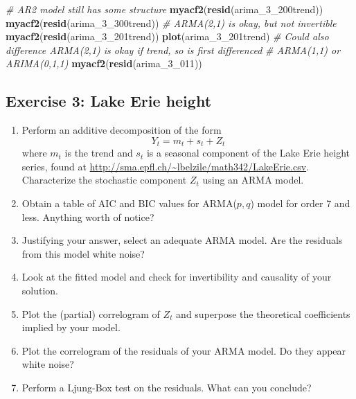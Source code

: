 \documentclass[]{book}
\newenvironment{Shaded}{\begin{snugshade}}{\end{snugshade}}
\newcommand{\CommentTok}[1]{\textcolor[rgb]{0.56,0.35,0.01}{\textit{#1}}}
\newcommand{\DecValTok}[1]{\textcolor[rgb]{0.00,0.00,0.81}{#1}}
\newcommand{\KeywordTok}[1]{\textcolor[rgb]{0.13,0.29,0.53}{\textbf{#1}}}
\newcommand{\NormalTok}[1]{#1}
\providecommand{\tightlist}{%
  \setlength{\itemsep}{0pt}\setlength{\parskip}{0pt}}
\begin{document}
\begin{Shaded}
\begin{Highlighting}[]
\CommentTok{# AR2 model still has some structure}
\KeywordTok{myacf2}\NormalTok{(}\KeywordTok{resid}\NormalTok{(arima_}\DecValTok{3}\NormalTok{_200trend))}
\KeywordTok{myacf2}\NormalTok{(}\KeywordTok{resid}\NormalTok{(arima_}\DecValTok{3}\NormalTok{_300trend))}
\CommentTok{# ARMA(2,1) is okay, but not invertible}
\KeywordTok{myacf2}\NormalTok{(}\KeywordTok{resid}\NormalTok{(arima_}\DecValTok{3}\NormalTok{_201trend))}
\KeywordTok{plot}\NormalTok{(arima_}\DecValTok{3}\NormalTok{_201trend)}
\CommentTok{# Could also difference ARMA(2,1) is okay if trend, so is first differenced}
\CommentTok{# ARMA(1,1) or ARIMA(0,1,1)}
\KeywordTok{myacf2}\NormalTok{(}\KeywordTok{resid}\NormalTok{(arima_}\DecValTok{3}\NormalTok{_}\DecValTok{011}\NormalTok{))}
\end{Highlighting}
\end{Shaded}

\hypertarget{exercise-3-lake-erie-height-1}{%
\subsection{Exercise 3: Lake Erie
height}\label{exercise-3-lake-erie-height-1}}

\begin{enumerate}
\def\labelenumi{\arabic{enumi}.}
\tightlist
\item
  Perform an additive decomposition of the form
  \[Y_t = m_t + s_t + Z_t\] where \(m_t\) is the trend and \(s_t\) is a
  seasonal component of the Lake Erie height series, found at
  \href{\%5Bhttp://sma.epfl.ch/~lbelzile/math342/LakeErie.csv\%5D}{http://sma.epfl.ch/\textasciitilde{}lbelzile/math342/LakeErie.csv}.
  Characterize the stochastic component \(Z_t\) using an ARMA model.
\item
  Obtain a table of AIC and BIC values for ARMA(\(p, q\)) model for
  order 7 and less. Anything worth of notice?
\item
  Justifying your answer, select an adequate ARMA model. Are the
  residuals from this model white noise?
\item
  Look at the fitted model and check for invertibility and causality of
  your solution.
\item
  Plot the (partial) correlogram of \(Z_t\) and superpose the
  theoretical coefficients implied by your model.
\item
  Plot the correlogram of the residuals of your ARMA model. Do they
  appear white noise?
\item
  Perform a Ljung-Box test on the residuals. What can you conclude?
\end{enumerate}
\end{document}
